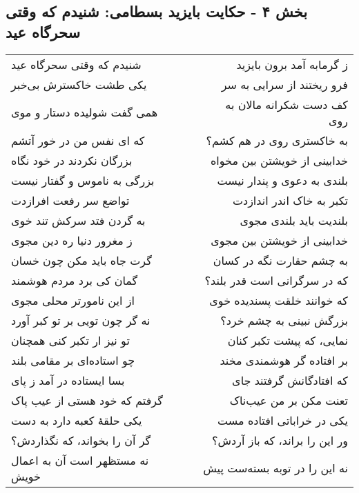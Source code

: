 \begin{center}
\section*{بخش ۴ - حکایت بایزید بسطامی: شنیدم که وقتی سحرگاه عید}
\label{sec:004}
\begin{longtable}{l p{0.5cm} r}
شنیدم که وقتی سحرگاه عید
&&
ز گرمابه آمد برون بایزید
\\
یکی طشت خاکسترش بی‌خبر
&&
فرو ریختند از سرایی به سر
\\
همی گفت شولیده دستار و موی
&&
کف دست شکرانه مالان به روی
\\
که ای نفس من در خور آتشم
&&
به خاکستری روی در هم کشم؟
\\
بزرگان نکردند در خود نگاه
&&
خدابینی از خویشتن بین مخواه
\\
بزرگی به ناموس و گفتار نیست
&&
بلندی به دعوی و پندار نیست
\\
تواضع سر رفعت افرازدت
&&
تکبر به خاک اندر اندازدت
\\
به گردن فتد سرکش تند خوی
&&
بلندیت باید بلندی مجوی
\\
ز مغرور دنیا ره دین مجوی
&&
خدابینی از خویشتن بین مجوی
\\
گرت جاه باید مکن چون خسان
&&
به چشم حقارت نگه در کسان
\\
گمان کی برد مردم هوشمند
&&
که در سرگرانی است قدر بلند؟
\\
از این نامورتر محلی مجوی
&&
که خوانند خلقت پسندیده خوی
\\
نه گر چون تویی بر تو کبر آورد
&&
بزرگش نبینی به چشم خرد؟
\\
تو نیز ار تکبر کنی همچنان
&&
نمایی، که پیشت تکبر کنان
\\
چو استاده‌ای بر مقامی بلند
&&
بر افتاده گر هوشمندی مخند
\\
بسا ایستاده در آمد ز پای
&&
که افتادگانش گرفتند جای
\\
گرفتم که خود هستی از عیب پاک
&&
تعنت مکن بر من عیب‌ناک
\\
یکی حلقهٔ کعبه دارد به دست
&&
یکی در خراباتی افتاده مست
\\
گر آن را بخواند، که نگذاردش؟
&&
ور این را براند، که باز آردش؟
\\
نه مستظهر است آن به اعمال خویش
&&
نه این را در توبه بسته‌ست پیش
\\
\end{longtable}
\end{center}
